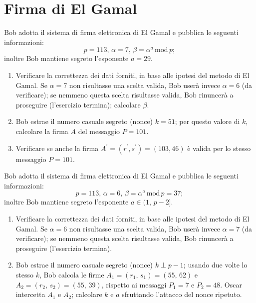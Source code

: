     \bigskip
    \section{Firma di El Gamal}
        Bob adotta il sistema di firma elettronica di El Gamal e pubblica le seguenti informazioni: \[
            p=113,\, \alpha = 7,\, \beta = \alpha^a\,\mathrm{mod}\,p
        ;\] inoltre Bob mantiene segreto l'esponente $a=29$.
        \begin{enumerate}
            \item Verificare la correttezza dei dati forniti, in base alle ipotesi del metodo di El Gamal. 
                Se $\alpha=7$ non risultasse una scelta valida, Bob userà invece $\alpha=6$ (da verificare); 
                se nemmeno questa scelta risultasse valida, Bob rinuncerà a proseguire (l'esercizio termina); 
                calcolare $\beta$.
            \item Bob estrae il numero casuale segreto (nonce) $k=51$; per questo valore di $k$, calcolare 
                la firma $A$ del messaggio $P=101$.
            \item Verificare se anche la firma $A^{\prime}=(r^{\prime}, s^{\prime})=(103,46)$ è valida per 
                lo stesso messaggio $P=101$.
        \end{enumerate}

        Bob adotta il sistema di firma elettronica di El Gamal e pubblica le seguenti informazioni: \[
            p=113,\, \alpha = 6,\, \beta = \alpha^a\,\mathrm{mod}\,p = 37
        ;\] inoltre Bob mantiene segreto l'esponente $a\in (1,\,p-2]$.
        \begin{enumerate}
            \item Verificare la correttezza dei dati forniti, in base alle ipotesi del metodo di El Gamal. 
                Se $\alpha=6$ non risultasse una scelta valida, Bob userà invece $\alpha=7$ (da verificare); 
                se nemmeno questa scelta risultasse valida, Bob rinuncerà a proseguire (l'esercizio termina).
            \item Bob estrae il numero casuale segreto (nonce) $k\perp p-1$; usando due volte lo stesso $k$, 
                Bob calcola le firme $A_1=(r_1,\,s_1)=(55,\,62)$ e $A_2=(r_2,\,s_2)=(55,\,39)$, rispetto ai 
                messaggi $P_1=7$ e $P_2=48$. Oscar intercetta $A_1$ e $A_2$; calcolare $k$ e $a$ sfruttando 
                l'attacco del nonce ripetuto.
        \end{enumerate}

